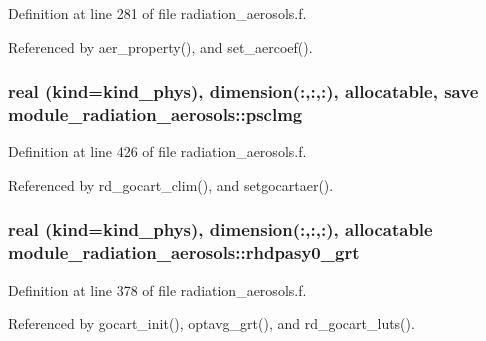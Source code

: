 Definition at line 281 of file radiation\+\_\+aerosols.\+f.



Referenced by aer\+\_\+property(), and set\+\_\+aercoef().

\subsubsection[{\texorpdfstring{psclmg}{psclmg}}]{\setlength{\rightskip}{0pt plus 5cm}real (kind=kind\+\_\+phys), dimension(\+:,\+:,\+:), allocatable, save module\+\_\+radiation\+\_\+aerosols\+::psclmg\hspace{0.3cm}{\ttfamily [private]}}\hypertarget{group__module__radiation__aerosols_ga942aa3a9f61cb40592bd0879a91c2ede}{}\label{group__module__radiation__aerosols_ga942aa3a9f61cb40592bd0879a91c2ede}


Definition at line 426 of file radiation\+\_\+aerosols.\+f.



Referenced by rd\+\_\+gocart\+\_\+clim(), and setgocartaer().

\subsubsection[{\texorpdfstring{rhdpasy0\+\_\+grt}{rhdpasy0_grt}}]{\setlength{\rightskip}{0pt plus 5cm}real (kind=kind\+\_\+phys), dimension(\+:,\+:,\+:), allocatable module\+\_\+radiation\+\_\+aerosols\+::rhdpasy0\+\_\+grt\hspace{0.3cm}{\ttfamily [private]}}\hypertarget{group__module__radiation__aerosols_gab5a0bbefbfed6b393f0abad26e6e4d04}{}\label{group__module__radiation__aerosols_gab5a0bbefbfed6b393f0abad26e6e4d04}


Definition at line 378 of file radiation\+\_\+aerosols.\+f.



Referenced by gocart\+\_\+init(), optavg\+\_\+grt(), and rd\+\_\+gocart\+\_\+luts().


